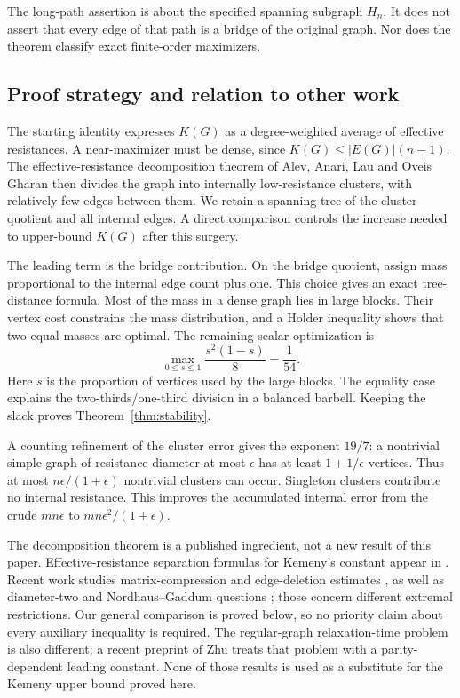 \documentclass[11pt]{amsart}
\numberwithin{equation}{section}
\theoremstyle{definition}
\theoremstyle{remark}
\begin{document}
The long-path assertion is about the specified spanning subgraph $H_n$. It does not assert that every edge of that path is a bridge of the original graph. Nor does the theorem classify exact finite-order maximizers.

\subsection{Proof strategy and relation to other work}
The starting identity expresses $K(G)$ as a degree-weighted average of effective resistances. A near-maximizer must be dense, since $K(G)\le |E(G)|(n-1)$. The effective-resistance decomposition theorem of Alev, Anari, Lau and Oveis Gharan \cite{AALG} then divides the graph into internally low-resistance clusters, with relatively few edges between them. We retain a spanning tree of the cluster quotient and all internal edges. A direct comparison controls the increase needed to upper-bound $K(G)$ after this surgery.

The leading term is the bridge contribution. On the bridge quotient, assign mass proportional to the internal edge count plus one. This choice gives an exact tree-distance formula. Most of the mass in a dense graph lies in large blocks. Their vertex cost constrains the mass distribution, and a Holder inequality shows that two equal masses are optimal. The remaining scalar optimization is
\[
\max_{0\le s\le1}\frac{s^2(1-s)}8=\frac1{54}.
\]
Here $s$ is the proportion of vertices used by the large blocks. The equality case explains the two-thirds/one-third division in a balanced barbell. Keeping the slack proves Theorem~\ref{thm:stability}.

A counting refinement of the cluster error gives the exponent $19/7$: a nontrivial simple graph of resistance diameter at most $\epsilon$ has at least $1+1/\epsilon$ vertices. Thus at most $n\epsilon/(1+\epsilon)$ nontrivial clusters can occur. Singleton clusters contribute no internal resistance. This improves the accumulated internal error from the crude $mn\epsilon$ to $mn\epsilon^2/(1+\epsilon)$.

The decomposition theorem is a published ingredient, not a new result of this paper. Effective-resistance separation formulas for Kemeny's constant appear in \cite{Faught}. Recent work studies matrix-compression and edge-deletion estimates \cite{Abiad}, as well as diameter-two and Nordhaus--Gaddum questions \cite{LiSunYang}; those concern different extremal restrictions. Our general comparison is proved below, so no priority claim about every auxiliary inequality is required. The regular-graph relaxation-time problem is also different; a recent preprint of Zhu \cite{Zhu} treats that problem with a parity-dependent leading constant. None of those results is used as a substitute for the Kemeny upper bound proved here.
\end{document}
